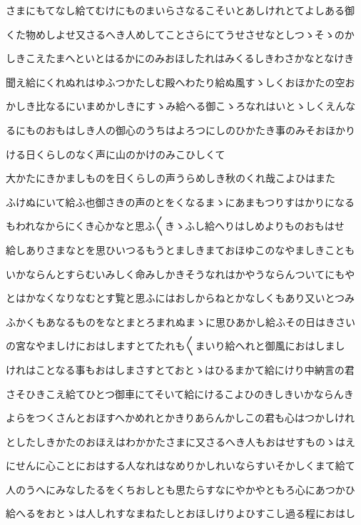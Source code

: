 \documentclass[a4paper,11pt,landscape]{ltjtarticle}
\begin{document}
さまにもてなし給てむけにものまいらさなるこそいとあしけれとてよしある御
\par\medskip
くた物めしよせ又さるへき人めしてことさらにてうせさせなとしつゝそゝのか
\par\medskip
しきこえたまへといとはるかにのみおほしたれはみくるしきわさかなとなけき
\par\medskip
聞え給にくれぬれはゆふつかたしむ殿へわたり給ぬ風すゝしくおほかたの空お
\par\medskip
かしき比なるにいまめかしきにすゝみ給へる御こゝろなれはいとゝしくえんな
\par\medskip
るにものおもはしき人の御心のうちはよろつにしのひかたき事のみそおほかり
\par\medskip
ける日くらしのなく声に山のかけのみこひしくて
\par\medskip
大かたにきかましものを日くらしの声うらめしき秋のくれ哉こよひはまた
\par\medskip
ふけぬにいて給ふ也御さきの声のとをくなるまゝにあまもつりすはかりになる
\par\medskip
もわれなからにくき心かなと思ふ〱きゝふし給へりはしめよりものおもはせ
\par\medskip
給しありさまなとを思ひいつるもうとましきまておほゆこのなやましきことも
\par\medskip
いかならんとすらむいみしく命みしかきそうなれはかやうならんついてにもや
\par\medskip
とはかなくなりなむとす覧と思ふにはおしからねとかなしくもあり又いとつみ
\par\medskip
ふかくもあなるものをなとまとろまれぬまゝに思ひあかし給ふその日はきさい
\par\medskip
の宮なやましけにおはしますとてたれも〱まいり給へれと御風におはしまし
\par\medskip
けれはことなる事もおはしまさすとておとゝはひるまかて給にけり中納言の君
\par\medskip
さそひきこえ給てひとつ御車にてそいて給にけるこよひのきしきいかならんき
\par\medskip
よらをつくさんとおほすへかめれとかきりあらんかしこの君も心はつかしけれ
\par\medskip
としたしきかたのおほえはわかかたさまに又さるへき人もおはせすものゝはえ
\par\medskip
にせんに心ことにおはする人なれはなめりかしれいならすいそかしくまて給て
\par\medskip
人のうへにみなしたるをくちおしとも思たらすなにやかやともろ心にあつかひ
\par\medskip
給へるをおとゝは人しれすなまねたしとおほしけりよひすこし過る程におはし
\end{document}
